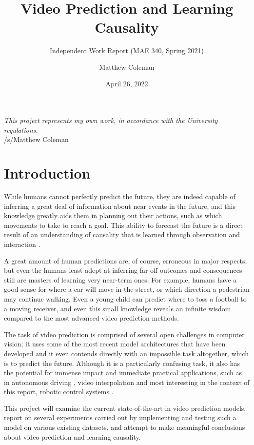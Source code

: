 \documentclass{scrartcl}
\title{Video Prediction and Learning Causality}
\subtitle{Independent Work Report (MAE 340, Spring 2021)}
\author{Matthew Coleman}
\date{April 26, 2022}
\begin{document}
\maketitle

\vspace{8cm}
\Large
\textit{This project represents my own work, in accordance with the University regulations.} \\
\hspace*{\fill} \large /s/Matthew Coleman
\normalsize

\newpage
\tableofcontents
\newpage

\section{Introduction}
\label{sec:intro}

While humans cannot perfectly predict the future, they are indeed capable of
inferring a great deal of information about near events in the future, and this
knowledge greatly aids them in planning out their actions, such as which
movements to take to reach a goal. This ability to forecast the future is a
direct result of an understanding of causality that is learned through
observation and interaction \cite{human_learning_sequences}.

A great amount of human predictions are, of course, erroneous in major
respects, but even the humans least adept at inferring far-off outcomes and
consequences still are masters of learning very near-term ones. For example,
humans have a good sense for where a car will move in the street, or which
direction a pedestrian may continue walking. Even a young child can predict
where to toss a football to a moving receiver, and even this small knowledge
reveals an infinite wisdom compared to the most advanced video prediction
methods.

The task of video prediction is comprised of several open challenges in
computer vision; it uses some of the most recent model architectures that have
been developed and it even contends directly with an impossible task
altogether, which is to predict the future. Although it is a particularly
confusing task, it also has the potential for immense impact and immediate
practical applications, such as in autonomous driving \cite{eg_self_driving},
video interpolation \cite{eg_video_interp} and most interesting in the context
of this report, robotic control systems \cite{eg_robot_control}.

This project will examine the current state-of-the-art in video prediction
models, report on several experiments carried out by implementing and testing
such a model on various existing datasets, and attempt to make meaningful
conclusions about video prediction and learning causality.
\end{document}
